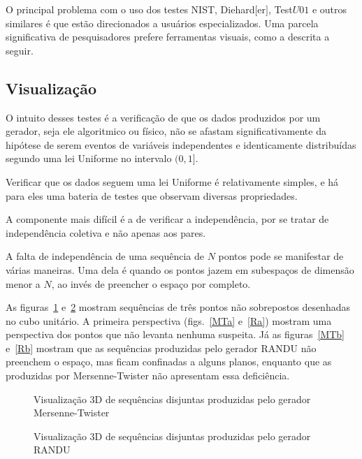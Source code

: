 O principal problema com o uso dos testes NIST, Diehard$[$er$]$, Test$U01$ e outros similares é que estão direcionados a usuários especializados.
Uma parcela significativa de pesquisadores prefere ferramentas visuais, como a descrita a seguir.

\subsection{Visualização}

O intuito desses testes é a verificação de que os dados produzidos por um gerador, seja ele algoritmico ou físico, não se afastam significativamente da hipótese de serem eventos de variáveis independentes e identicamente distribuídas segundo uma lei Uniforme no intervalo $(0,1]$.

Verificar que os dados seguem uma lei Uniforme é relativamente simples, e há para eles uma bateria de testes que observam diversas propriedades.

A componente mais difícil é a de verificar a independência, por se tratar de independência coletiva e não apenas aos pares.

A falta de independência de uma sequência de $N$ pontos pode se manifestar de várias maneiras.
Uma dela é quando os pontos jazem em subespaços de dimensão menor a $N$, ao invés de preencher o espaço por completo.

As figuras~\ref{fig:3DMT} e~\ref{fig:3DRandu} mostram sequências de três pontos não sobrepostos desenhadas no cubo unitário.
A primeira perspectiva (figs.~\ref{MTa} e~\ref{Ra}) mostram uma perspectiva dos pontos que não levanta nenhuma suspeita.
Já as figuras~\ref{MTb} e~\ref{Rb} mostram que as sequências produzidas pelo gerador RANDU não preenchem o espaço, mas ficam confinadas a alguns planos, enquanto que as produzidas por Mersenne-Twister não apresentam essa deficiência.

\begin{figure}[hbt]
\centering
{}
\caption{Visualização 3D de sequências disjuntas produzidas pelo gerador Mersenne-Twister}\label{fig:3DMT}
\end{figure}

\begin{figure}[hbt]
\centering
{}
\caption{Visualização 3D de sequências disjuntas produzidas pelo gerador RANDU}\label{fig:3DRandu}
\end{figure}

